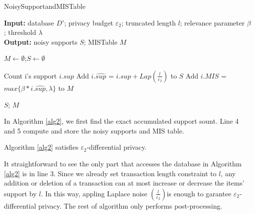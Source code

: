 \documentclass[conference]{IEEEtran}
\begin{document}
\begin{algorithm}[htbp]
    \caption{NoisySupportandMISTable}
    \hspace*{0.02in} {\bf Input:} %
    database $D'$; privacy budget $\varepsilon_2$; truncated length $l$; relevance parameter $\beta$; threshold $\lambda$\\
    \hspace*{0.02in} {\bf Output:} %
    noisy supports $S$; MISTable $M$

    \begin{algorithmic}[1]
        \State $M\leftarrow \emptyset$;$S\leftarrow \emptyset$

        \State Count i's support $i.sup$
        \State Add $i.\hat{sup}$ = $i.sup + Lap(\frac{l}{\varepsilon_2})$ to $S$
        \State Add $i.MIS$ = $max\{ \beta * i.\hat{sup}, \lambda\} $ to $M$
        \EndFor
        
    \State \Return $S$; $M$
    \end{algorithmic} 
    \label{alg2}
\end{algorithm}

In Algorithm \ref{alg2}, we first find the exact accumulated support sount. 
Line 4 and 5 compute and store the noisy supports and MIS table.
\begin{theorem}
    Algorithm \ref{alg2} satisfies $\varepsilon_2$-differential privacy.
    \label{th2}
\end{theorem}
\begin{IEEEproof}
It straightforward to see the only part that accesses the database in Algorithm \ref{alg2} is in line 3.
Since we already set transaction length constraint to $l$, any addition or deletion of a transaction can at most increase or decrease the items' support by $l$.
In this way, appling Laplace noise $(\frac{l}{\varepsilon_2})$is enough to garantee $\varepsilon_2$-differential privacy.
The rest of algorithm only performs post-processing.
\end{IEEEproof}
\end{document}
